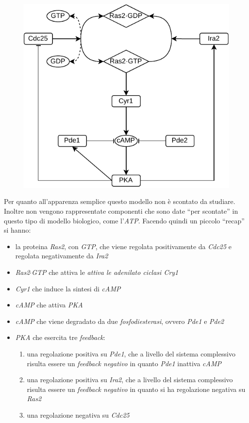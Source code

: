 \documentclass[a4paper,12pt, oneside]{book}
\begin{document}
\begin{figure}[H]
  \centering
  \includegraphics[scale = 1]{img/glucomodel.pdf}
\end{figure}
Per quanto all'apparenza semplice questo modello non è scontato da
studiare. Inoltre non vengono rappresentate componenti che sono date ``per
scontate'' in questo tipo di modello biologico, come l'\textit{ATP}. Facendo
quindi un piccolo ``recap'' si hanno:
\begin{itemize}
  \item la proteina \textit{Ras2}, con \textit{GTP}, che viene regolata
  positivamente da \textit{Cdc25} e regolata negativamente da \textit{Ira2}
  \item \textit{Ras2}$\cdot$\textit{GTP} che attiva le \textit{attiva le
    adenilato ciclasi Cry1}
  \item \textit{Cyr1} che induce la sintesi di \textit{cAMP}
  \item \textit{cAMP} che attiva \textit{PKA}
  \item \textit{cAMP} che viene degradato da due \textit{fosfodiesterasi},
  ovvero \textit{Pde1} e \textit{Pde2} 
  \item \textit{PKA} che esercita tre \textit{feedback}:
  \begin{enumerate}
    \item una regolazione positiva su \textit{Pde1}, che a livello del sistema
    complessivo risulta essere un \textit{feedback negativo} in quanto
    \textit{Pde1} inattiva \textit{cAMP}
    \item una regolazione positiva su \textit{Ira2}, che a livello del sistema 
    complessivo risulta essere un \textit{feedback negativo} in quanto si ha
    regolazione negativa su \textit{Ras2}
    \item una regolazione negativa su \textit{Cdc25}
  \end{enumerate}
\end{itemize}
\end{document}
